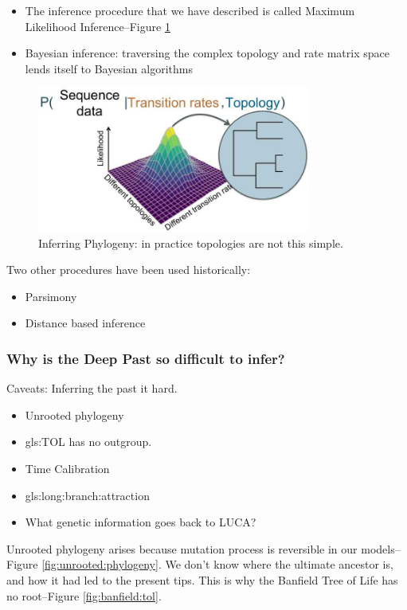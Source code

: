 \documentclass[]{article}
\begin{document}
\begin{itemize}
	\item The inference procedure that we have described is called Maximum Likelihood Inference\cite{huelsenbeck1997phylogeny}--Figure \ref{fig:InferingPhylogeny}
	\item Bayesian inference: traversing the complex topology and
	rate matrix space lends itself to Bayesian algorithms\cite{huelsenbeck2001mrbayes,huelsenbeck2001introduction}
\end{itemize}
\begin{figure}[H]
	\caption[Inferring Phylogeny]{Inferring Phylogeny: in practice topologies are not this simple.}\label{fig:InferingPhylogeny}
	\includegraphics[width=0.8\textwidth]{InferingPhylogeny}
\end{figure}
Two other procedures have been used historically:
\begin{itemize}
	\item Parsimony
	\item Distance based inference
\end{itemize}

\subsubsection{Why is the Deep Past so difficult to infer?}
Caveats: Inferring the past it hard.
\begin{itemize}
	\item Unrooted phylogeny
	\item \gls{gls:TOL} has no outgroup.
	\item Time Calibration
	\item \Gls{gls:long:branch:attraction}
	\item What genetic information goes back to LUCA?
\end{itemize}

Unrooted phylogeny arises because mutation process is reversible in our models--Figure \ref{fig:unrooted:phylogeny}. We don't know where the ultimate ancestor is, and how it had led to the present tips. This is why the Banfield Tree of Life has no root--Figure \ref{fig:banfield:tol}.
 
\end{document}
